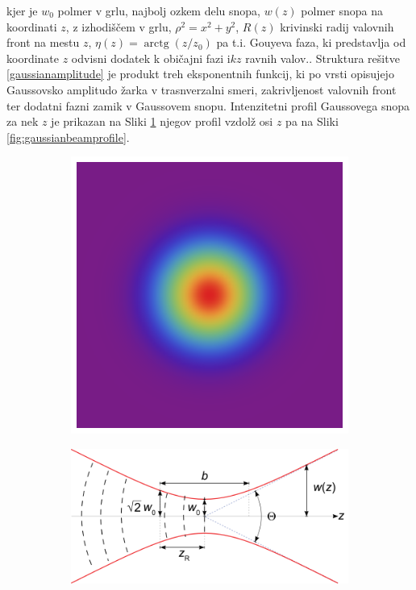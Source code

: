 \documentclass[longbibliography,slovene,a4paper,12pt]{book}
\newcommand{\I}{\text{i}}
\DeclareMathOperator{\arctg}{arctg}
\begin{document}
kjer je $w_0$ polmer v grlu, najbolj ozkem delu snopa, $w(z)$ polmer snopa na koordinati $z$, z izhodiščem v grlu, $\rho^2 = x^2 +y^2$, $R(z)$ krivinski radij valovnih front na mestu $z$, $\eta(z) = \arctg (z/z_0)$ pa t.i. Gouyeva faza, ki predstavlja od koordinate $z$ odvisni dodatek k običajni fazi $\I kz$ ravnih valov.. Struktura rešitve \ref{gaussianamplitude} je produkt treh eksponentnih funkcij, ki po vrsti opisujejo Gaussovsko amplitudo žarka v trasnverzalni smeri, zakrivljenost valovnih front ter dodatni fazni zamik v Gaussovem snopu\cite{saleh}. Intenzitetni profil Gaussovega snopa za nek $z$ je prikazan na Sliki \ref{fig:gaussianbeam} njegov profil vzdolž osi $z$ pa na Sliki \ref{fig:gaussianbeamprofile}.
\begin{figure}[h!]
	\centering
	\begin{subfigure}[b]{0.35\textwidth}
	\includegraphics[width=\textwidth]{slike/lg_00.png}
	\label{fig:gaussianbeam}
	\end{subfigure}
	\quad
	\begin{subfigure}[b]{0.45\textwidth}
	\includegraphics[width=\textwidth]{slike/gaussian_beam_profile_edited.png}

\end{subfigure}
\end{figure}
\end{document}
